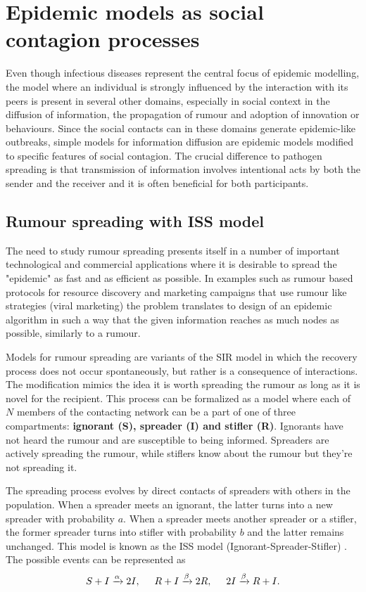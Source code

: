 \documentclass[times, utf8, diplomski]{fer}
\begin{document}
\section{Epidemic models as social contagion processes}
Even though infectious diseases represent the central focus of epidemic modelling, the model where an individual is strongly influenced by the interaction with its peers is present in several other domains, especially in social context in the diffusion of information, the propagation of rumour and adoption of innovation or behaviours.  Since the social contacts can in these domains generate epidemic-like outbreaks, simple models for information diffusion are epidemic models modified to specific features of social contagion. The crucial difference to pathogen spreading is that transmission of information involves intentional acts by both the sender and the receiver and it is often beneficial for both participants.

\subsection{Rumour spreading with ISS model}
The need to study rumour spreading presents itself in a number of important technological and commercial applications where it is desirable to spread the "epidemic" as fast and as efficient as possible.  In examples such as rumour based protocols for resource discovery and marketing campaigns that use rumour like strategies (viral marketing)  the problem translates to design of an epidemic algorithm in such a way that the given information reaches as much nodes as possible, similarly to a rumour.

Models for rumour spreading are variants of the SIR model in which the recovery process does not occur spontaneously, but rather is a consequence of interactions. The modification mimics the idea it is worth spreading the rumour as long as it is novel for the recipient. This process can be formalized as a model where each of  $N$ members of the contacting network can be a part of one of three compartments: \textbf{ignorant (S), spreader (I) and stifler (R)}. Ignorants have not heard the rumour and are susceptible to being informed. Spreaders are actively spreading the rumour, while stiflers know about the rumour but they're not  spreading it.
 
The spreading process evolves by direct contacts of spreaders with others in the population. When a spreader meets an ignorant, the latter turns into a new spreader with probability $a$. When a spreader meets another spreader or a stifler, the former spreader turns into stifler with probability $b$ and the latter remains unchanged. This model is known as the ISS model (Ignorant-Spreader-Stifler) \cite{Moreno2004}. The possible events can be represented as 
\begin{equation}
S + I \xrightarrow{\alpha} 2I,\hspace{5mm}  R + I \xrightarrow{\beta} 2R,  \hspace{5mm} 2I \xrightarrow{\beta} R + I.
\end{equation}
\end{document}
